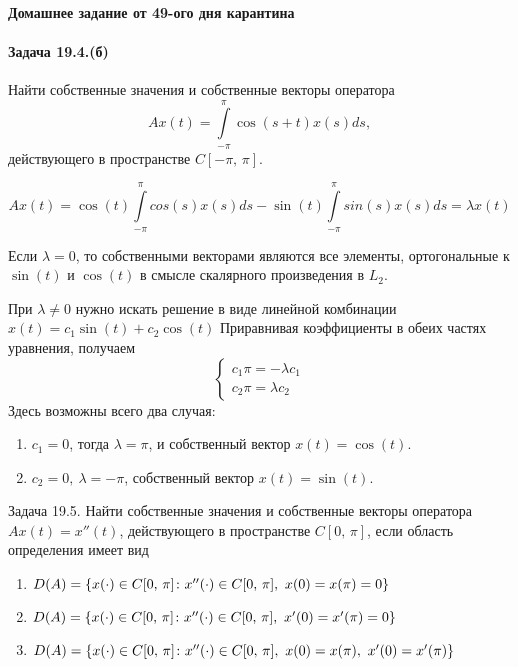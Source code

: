 \documentclass[16pt]{article}
\newenvironment{Sol}{\par\noindent{\it Решение:}}
\newcommand\A{(\cdot)}
\newcommand\Int[2]{\int\limits_{#1}^{#2}}
\begin{document}
\paragraph{Домашнее задание от 49-ого дня карантина}
\paragraph{Задача 19.4.(б)} Найти собственные значения и собственные векторы оператора
$$Ax(t) = \Int{-\pi}{\pi}\cos(s+t)x(s)ds,$$
действующего в пространстве $C[-\pi,\,\pi]$.
\begin{Sol}
$$Ax(t) = \cos(t)\Int{-\pi}{\pi}cos(s)x(s)ds - \sin(t)\Int{-\pi}{\pi}sin(s)x(s)ds = \lambda x(t)$$

Если $\lambda = 0$, то собственными векторами являются все элементы, ортогональные к $\sin(t)$ и $\cos(t)$ в
смысле скалярного произведения в $L_2$. 

При $\lambda \not= 0$ нужно искать решение в виде линейной комбинации $x(t) = c_1 \sin(t) + c_2 \cos(t)$
Приравнивая коэффициенты в обеих частях уравнения, получаем
\[
\begin{cases}
	c_1 \pi = -\lambda c_1 \\
	c_2 \pi = \lambda c_2
\end{cases}
\] 
Здесь возможны всего два случая: 
\begin{enumerate}
\item $c_1 = 0$, тогда $\lambda = \pi$, и собственный вектор $x(t) = \cos(t)$.
\item $c_2 = 0,\ \lambda = -\pi$, собственный вектор $x(t) = \sin(t)$.
\end{enumerate}
\end{Sol} 

\paragraph{Задача 19.5.} Найти собственные значения и собственные векторы оператора $Ax(t) = x''(t)$, действующего
в пространстве $C[0,\,\pi]$, если область определения имеет вид
\begin{enumerate}
\item $D(A) = \{x\A \in C[0,\,\pi]\colon x''\A \in C[0,\,\pi],\ x(0) = x(\pi) = 0\}$
\item $D(A) = \{x\A \in C[0,\,\pi]\colon x''\A \in C[0,\,\pi],\ x'(0) = x'(\pi) = 0\}$
\item $D(A) = \{x\A \in C[0,\,\pi]\colon x''\A \in C[0,\,\pi],\ x(0) = x(\pi),\ x'(0) = x'(\pi)\}$
\end{enumerate}
\end{document}
